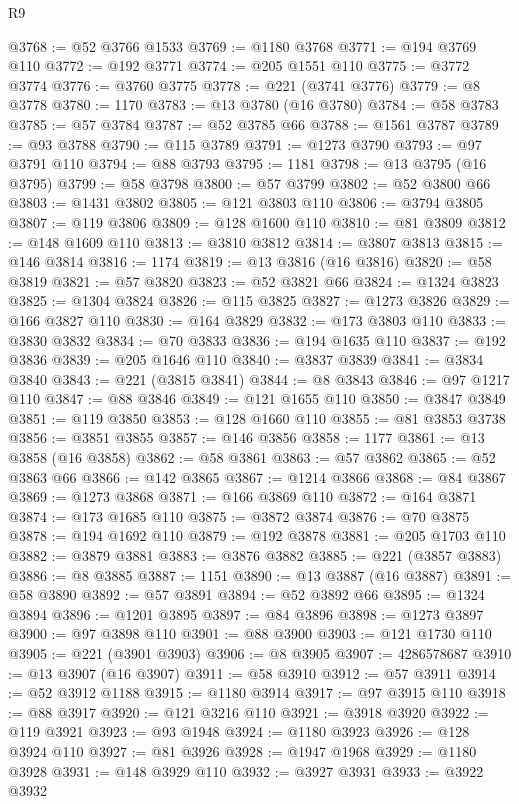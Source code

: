 \begin{lexlean}{R9}
\begin{coremodule}
@3768 := @52 @3766 @1533
@3769 := @1180 @3768
@3771 := @194 @3769 @110
@3772 := @192 @3771
@3774 := @205 @1551 @110
@3775 := @3772 @3774
@3776 := @3760 @3775
@3778 := @221 (@3741 @3776)
@3779 := @8 @3778
@3780 := 1170
@3783 := @13 @3780 (@16 @3780)
@3784 := @58 @3783
@3785 := @57 @3784
@3787 := @52 @3785 @66
@3788 := @1561 @3787
@3789 := @93 @3788
@3790 := @115 @3789
@3791 := @1273 @3790
@3793 := @97 @3791 @110
@3794 := @88 @3793
@3795 := 1181
@3798 := @13 @3795 (@16 @3795)
@3799 := @58 @3798
@3800 := @57 @3799
@3802 := @52 @3800 @66
@3803 := @1431 @3802
@3805 := @121 @3803 @110
@3806 := @3794 @3805
@3807 := @119 @3806
@3809 := @128 @1600 @110
@3810 := @81 @3809
@3812 := @148 @1609 @110
@3813 := @3810 @3812
@3814 := @3807 @3813
@3815 := @146 @3814
@3816 := 1174
@3819 := @13 @3816 (@16 @3816)
@3820 := @58 @3819
@3821 := @57 @3820
@3823 := @52 @3821 @66
@3824 := @1324 @3823
@3825 := @1304 @3824
@3826 := @115 @3825
@3827 := @1273 @3826
@3829 := @166 @3827 @110
@3830 := @164 @3829
@3832 := @173 @3803 @110
@3833 := @3830 @3832
@3834 := @70 @3833
@3836 := @194 @1635 @110
@3837 := @192 @3836
@3839 := @205 @1646 @110
@3840 := @3837 @3839
@3841 := @3834 @3840
@3843 := @221 (@3815 @3841)
@3844 := @8 @3843
@3846 := @97 @1217 @110
@3847 := @88 @3846
@3849 := @121 @1655 @110
@3850 := @3847 @3849
@3851 := @119 @3850
@3853 := @128 @1660 @110
@3855 := @81 @3853 @3738
@3856 := @3851 @3855
@3857 := @146 @3856
@3858 := 1177
@3861 := @13 @3858 (@16 @3858)
@3862 := @58 @3861
@3863 := @57 @3862
@3865 := @52 @3863 @66
@3866 := @142 @3865
@3867 := @1214 @3866
@3868 := @84 @3867
@3869 := @1273 @3868
@3871 := @166 @3869 @110
@3872 := @164 @3871
@3874 := @173 @1685 @110
@3875 := @3872 @3874
@3876 := @70 @3875
@3878 := @194 @1692 @110
@3879 := @192 @3878
@3881 := @205 @1703 @110
@3882 := @3879 @3881
@3883 := @3876 @3882
@3885 := @221 (@3857 @3883)
@3886 := @8 @3885
@3887 := 1151
@3890 := @13 @3887 (@16 @3887)
@3891 := @58 @3890
@3892 := @57 @3891
@3894 := @52 @3892 @66
@3895 := @1324 @3894
@3896 := @1201 @3895
@3897 := @84 @3896
@3898 := @1273 @3897
@3900 := @97 @3898 @110
@3901 := @88 @3900
@3903 := @121 @1730 @110
@3905 := @221 (@3901 @3903)
@3906 := @8 @3905
@3907 := 4286578687
@3910 := @13 @3907 (@16 @3907)
@3911 := @58 @3910
@3912 := @57 @3911
@3914 := @52 @3912 @1188
@3915 := @1180 @3914
@3917 := @97 @3915 @110
@3918 := @88 @3917
@3920 := @121 @3216 @110
@3921 := @3918 @3920
@3922 := @119 @3921
@3923 := @93 @1948
@3924 := @1180 @3923
@3926 := @128 @3924 @110
@3927 := @81 @3926
@3928 := @1947 @1968
@3929 := @1180 @3928
@3931 := @148 @3929 @110
@3932 := @3927 @3931
@3933 := @3922 @3932

\end{coremodule}
\end{lexlean}
